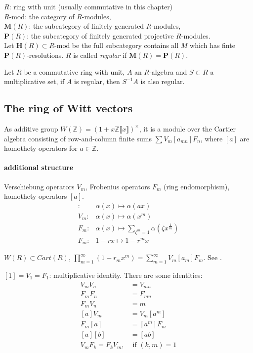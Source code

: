 $R$: ring with unit (usually commutative in this chapter)\\
$R$-mod: the category of $R$-modules,\\
$\mathbf{M}(R)$: the subcategory of finitely generated $R$-modules,\\
$\mathbf{P}(R)$: the subcategory of finitely generated projective $R$-modules.\\


Let $\mathbf{H}(R)\subset \mbox{$R$-mod} $ be the full subcategory contains all $M$ which has finte $\mathbf{P}(R)$-resolutions. $R$ is called {\em{regular}} if $\mathbf{M}(R)=\mathbf{P}(R)$.

\begin{prop}
	Let $R$ be a commutative ring with unit, $A$ an $R$-algebra and $S\subset R$ a multiplicative set, if $A$ is regular, then $S^{-1}A$ is also regular.
\end{prop}

\subsection{The ring of Witt vectors} %
\label{sub:the_ring_of_witt_vectors}
As additive group $W(\mathbb{Z})=(1+x \mathbb{Z}\llbracket x\rrbracket )^{\times}$, it is a module over the Cartier algebra consisting of row-and-column finite sums $\sum V_m [a_{mn}]F_n$, where $[a]$ are homothety operators for $a\in \mathbb{Z}$.

\paragraph{additional structure}
Verschiebung operators $V_m$, Frobenius operators $F_m$ (ring endomorphism), homothety operators $[a]$.
\begin{align*}
[a]\colon & \alpha(x) \mapsto \alpha(ax)\\
V_m\colon & \alpha(x) \mapsto \alpha(x^m)\\
F_m\colon & \alpha(x) \mapsto \sum_{\zeta^m=1} \alpha(\zeta x^{\frac{1}{m}})\\
F_m\colon & 1-rx \mapsto 1-r^mx
\end{align*}
\begin{remark}
	$W(R)\subset Cart(R)$, $\prod_{m=1}^\infty(1-r_mx^m)=\sum_{m=1}^\infty V_m[a_m]F_m$. See \cite{MR96j:16008}.
\end{remark}
\begin{prop}
	$[1]=V_1=F_1$: multiplicative identity. There are some identities:
	\begin{align*}
	 V_mV_n&=V_{mn}\\
	 F_mF_n&=F_{mn}\\
	 F_mV_n&=m\\
	 [a]V_m&=V_{m}[a^m]\\
	 F_m[a]&=[a^m] F_m\\
	 [a][b]&=[ab]\\
	 V_mF_k=F_kV_m,&\mbox{ if } (k,m)=1 \\
	\end{align*}
	
\end{prop}

